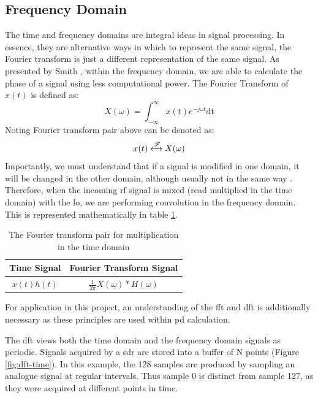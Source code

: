 \documentclass[class=report,11pt,crop=false]{standalone}
\begin{document}
\subsection{Frequency Domain}
The time and frequency domains are integral ideas in signal processing. In essence, they are alternative ways in which to represent the same signal, the Fourier transform is just a different representation of the same signal. As presented by Smith \cite{smith}, within the frequency domain, we are able to calculate the phase of a signal using less computational power. 
The Fourier Transform of $x(t)$ is defined as:
\begin{equation}
    X(\omega) = \int_{-\infty}^{\infty} x(t) e^{-j \omega t} \mathrm{dt}
\end{equation}
Noting Fourier transform pair above can be denoted as:
\begin{equation}
    x(t) \xleftrightarrow{\mathscr{F}} X(\omega)
\end{equation}
Importantly, we must understand that if a signal is modified in one domain, it will be changed in the other domain, although usually not in the same way \cite{sdr-for-engineers}. Therefore, when the incoming \gls{rf} signal is mixed (read multiplied in the time domain) with the \gls{lo}, we are performing convolution in the frequency domain. This is represented mathematically in table \ref{tab:fourier-pari}.

\begin{table}[h]
    \centering
    \begin{tabular}{c | c}
    \textbf{Time Signal} & \textbf{Fourier Transform Signal} \\
    \hline
    $x(t)h(t)$ & $ {\frac{1}{2 \pi}}  X(\omega) * H(\omega)$  
    \end{tabular}
    \caption{The Fourier transform pair for multiplication in the time domain}
    \label{tab:fourier-pari}
\end{table}

For application in this project, an understanding of the \gls{fft} and \gls{dft} is additionally necessary as these principles are used within \gls{pd} calculation. 

The \gls{dft} views both the time domain and the frequency domain signals as periodic. 
Signals acquired by a \gls{sdr} are stored into a buffer of N points (Figure \ref{fig:dft-time}). In this example, the 128 samples are produced by sampling an analogue signal at regular intervals. Thus sample 0 is distinct from sample 127, as they were acquired at different points in time. 
\end{document}
